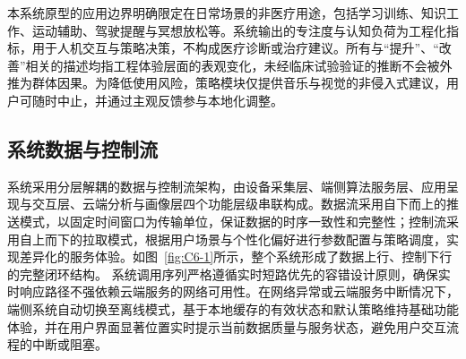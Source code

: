 本系统原型的应用边界明确限定在日常场景的非医疗用途，包括学习训练、知识工作、运动辅助、驾驶提醒与冥想放松等。系统输出的专注度与认知负荷为工程化指标，用于人机交互与策略决策，不构成医疗诊断或治疗建议。所有与“提升”、“改善”相关的描述均指工程体验层面的表观变化，未经临床试验验证的推断不会被外推为群体因果。为降低使用风险，策略模块仅提供音乐与视觉的非侵入式建议，用户可随时中止，并通过主观反馈参与本地化调整。






\subsection{系统数据与控制流}
系统采用分层解耦的数据与控制流架构，由设备采集层、端侧算法服务层、应用呈现与交互层、云端分析与画像层四个功能层级串联构成。数据流采用自下而上的推送模式，以固定时间窗口为传输单位，保证数据的时序一致性和完整性；控制流采用自上而下的拉取模式，根据用户场景与个性化偏好进行参数配置与策略调度，实现差异化的服务体验。如图~\ref{fig:C6-1}所示，整个系统形成了数据上行、控制下行的完整闭环结构。
系统调用序列严格遵循实时短路优先的容错设计原则，确保实时响应路径不强依赖云端服务的网络可用性。在网络异常或云端服务中断情况下，端侧系统自动切换至离线模式，基于本地缓存的有效状态和默认策略维持基础功能体验，并在用户界面显著位置实时提示当前数据质量与服务状态，避免用户交互流程的中断或阻塞。



